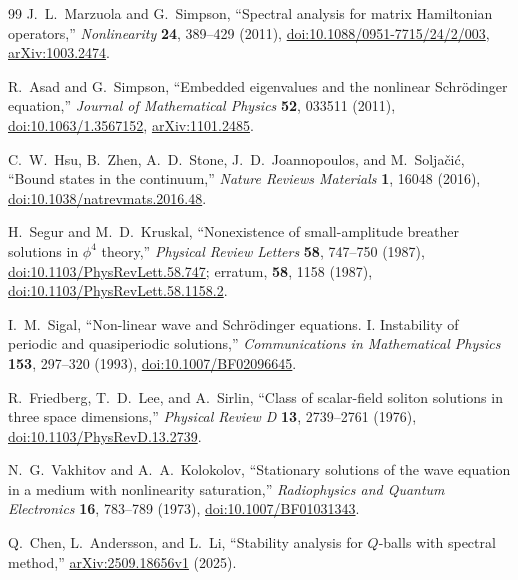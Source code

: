 \begin{thebibliography}{99}
J.~L.~Marzuola and G.~Simpson,
``Spectral analysis for matrix Hamiltonian operators,''
\emph{Nonlinearity} \textbf{24}, 389--429 (2011),
\href{https://doi.org/10.1088/0951-7715/24/2/003}{doi:10.1088/0951-7715/24/2/003},
\href{https://arxiv.org/abs/1003.2474}{arXiv:1003.2474}.

R.~Asad and G.~Simpson,
``Embedded eigenvalues and the nonlinear Schr\"odinger equation,''
\emph{Journal of Mathematical Physics} \textbf{52}, 033511 (2011),
\href{https://doi.org/10.1063/1.3567152}{doi:10.1063/1.3567152},
\href{https://arxiv.org/abs/1101.2485}{arXiv:1101.2485}.

C.~W.~Hsu, B.~Zhen, A.~D.~Stone, J.~D.~Joannopoulos, and M.~Solja\v{c}i\'c,
``Bound states in the continuum,''
\emph{Nature Reviews Materials} \textbf{1}, 16048 (2016),
\href{https://doi.org/10.1038/natrevmats.2016.48}{doi:10.1038/natrevmats.2016.48}.

H.~Segur and M.~D.~Kruskal,
``Nonexistence of small-amplitude breather solutions in $\phi^4$ theory,''
\emph{Physical Review Letters} \textbf{58}, 747--750 (1987),
\href{https://doi.org/10.1103/PhysRevLett.58.747}{doi:10.1103/PhysRevLett.58.747};
erratum, \textbf{58}, 1158 (1987),
\href{https://doi.org/10.1103/PhysRevLett.58.1158.2}{doi:10.1103/PhysRevLett.58.1158.2}.

I.~M.~Sigal,
``Non-linear wave and Schr\"odinger equations. I. Instability of periodic and quasiperiodic solutions,''
\emph{Communications in Mathematical Physics} \textbf{153}, 297--320 (1993),
\href{https://doi.org/10.1007/BF02096645}{doi:10.1007/BF02096645}.

R.~Friedberg, T.~D.~Lee, and A.~Sirlin,
``Class of scalar-field soliton solutions in three space dimensions,''
\emph{Physical Review D} \textbf{13}, 2739--2761 (1976),
\href{https://doi.org/10.1103/PhysRevD.13.2739}{doi:10.1103/PhysRevD.13.2739}.

N.~G.~Vakhitov and A.~A.~Kolokolov,
``Stationary solutions of the wave equation in a medium with nonlinearity saturation,''
\emph{Radiophysics and Quantum Electronics} \textbf{16}, 783--789 (1973),
\href{https://doi.org/10.1007/BF01031343}{doi:10.1007/BF01031343}.

Q.~Chen, L.~Andersson, and L.~Li,
``Stability analysis for $Q$-balls with spectral method,''
\href{https://arxiv.org/abs/2509.18656v1}{arXiv:2509.18656v1} (2025).


\end{thebibliography}
